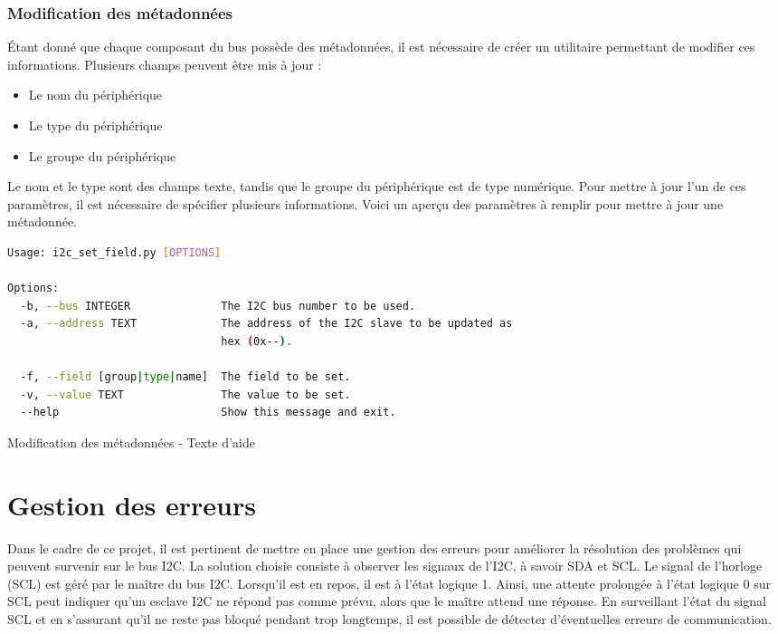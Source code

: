 \subsubsection{Modification des métadonnées}

Étant donné que chaque composant du bus possède des métadonnées, il est nécessaire de créer un utilitaire permettant de modifier ces informations.
Plusieurs champs peuvent être mis à jour :

\begin{itemize}
    \item Le nom du périphérique
    \item Le type du périphérique
    \item Le groupe du périphérique
\end{itemize}

Le nom et le type sont des champs texte, tandis que le groupe du périphérique est de type numérique.
Pour mettre à jour l'un de ces paramètres, il est nécessaire de spécifier plusieurs informations.
Voici un aperçu des paramètres à remplir pour mettre à jour une métadonnée.

\begin{listing}[!h]
    \begin{lstlisting}[language=bash]
Usage: i2c_set_field.py [OPTIONS]

Options:
  -b, --bus INTEGER              The I2C bus number to be used.
  -a, --address TEXT             The address of the I2C slave to be updated as
                                 hex (0x--).

  -f, --field [group|type|name]  The field to be set.
  -v, --value TEXT               The value to be set.
  --help                         Show this message and exit.
    \end{lstlisting}
    \caption{Modification des métadonnées - Texte d'aide}
\end{listing}

\section{Gestion des erreurs}

Dans le cadre de ce projet, il est pertinent de mettre en place une gestion des erreurs pour améliorer la résolution des problèmes qui peuvent survenir sur le bus I2C.
La solution choisie consiste à observer les signaux de l'I2C, à savoir SDA et SCL.
Le signal de l'horloge (SCL) est géré par le maître du bus I2C. Lorsqu'il est en repos, il est à l'état logique 1.
Ainsi, une attente prolongée à l'état logique 0 sur SCL peut indiquer qu'un esclave I2C ne répond pas comme prévu, alors que le maître attend une réponse.
En surveillant l'état du signal SCL et en s'assurant qu'il ne reste pas bloqué pendant trop longtemps, il est possible de détecter d'éventuelles erreurs de communication.

